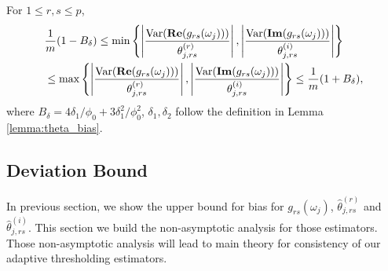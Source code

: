\begin{lem}
For $1\le r, s\le p$, 
\label{lemma: variance_ratio_error}
\begin{equation}
\begin{aligned}
& \frac{1}{m}(1-B_\delta) \le \min\left\{\left|\frac{\mathrm{Var}({\bf Re}(g_{rs}(\omega_j)))}{\theta^{(r)}_{j, rs}}\right|, \left|\frac{\mathrm{Var}({\bf Im}(g_{rs}(\omega_j)))}{\theta^{(i)}_{j, rs}}\right|\right\}\\
& \le \max\left\{\left|\frac{\mathrm{Var}({\bf Re}(g_{rs}(\omega_j)))}{\theta^{(r)}_{j, rs}}\right|, \left|\frac{\mathrm{Var}({\bf Im}(g_{rs}(\omega_j)))}{\theta^{(i)}_{j, rs}}\right|\right\} \le \frac{1}{m}(1+B_\delta),
\end{aligned}
\end{equation}
where $B_\delta = 4\delta_1/\phi_0 + 3\delta_1^2/\phi_0^2$, $\delta_1, \delta_2$ follow the definition in Lemma \ref{lemma:theta_bias}. 
\end{lem}


\subsection{Deviation Bound} 
In previous section,  we show the upper bound for bias for $g_{rs}(\omega_j)$, $\hat{\theta}^{(r)}_{j, rs}$ and $\hat{\theta}^{(i)}_{j, rs}$. This section we build the non-asymptotic analysis for those estimators. Those non-asymptotic analysis will lead to 
main theory for consistency of our adaptive thresholding estimators. 


